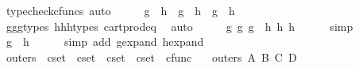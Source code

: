 \begin{isabellebody}
\ {\isacharparenleft}{\kern0pt}typecheck{\isacharunderscore}{\kern0pt}cfuncs{\isacharcomma}{\kern0pt}\ auto{\isacharparenright}{\kern0pt}\isanewline
\ \ \isamarkupfalse%
\ \isamarkupfalse%
\ {\isachardoublequoteopen}g{}\ {\isacharequal}{\kern0pt}\ h{}\ {\isasymand}\ g{}\ {\isacharequal}{\kern0pt}\ h{}\ {\isasymand}\ g{}\ {\isacharequal}{\kern0pt}\ h{}{\isachardoublequoteclose}\isanewline
\ \ \ \ \isamarkupfalse%
\ g{}{\isacharunderscore}{\kern0pt}g{}{\isacharunderscore}{\kern0pt}g{}{\isacharunderscore}{\kern0pt}types\ h{}{\isacharunderscore}{\kern0pt}h{}{\isacharunderscore}{\kern0pt}h{}{\isacharunderscore}{\kern0pt}types\ cart{\isacharunderscore}{\kern0pt}prod{\isacharunderscore}{\kern0pt}eq{}\ \isamarkupfalse%
\ auto\isanewline
\ \ \isamarkupfalse%
\ \isamarkupfalse%
\ {\isachardoublequoteopen}{\isasymlangle}g{}{\isacharcomma}{\kern0pt}\ {\isasymlangle}g{}{\isacharcomma}{\kern0pt}\ g{}{\isasymrangle}{\isasymrangle}\ {\isacharequal}{\kern0pt}\ {\isasymlangle}h{}{\isacharcomma}{\kern0pt}\ {\isasymlangle}h{}{\isacharcomma}{\kern0pt}\ h{}{\isasymrangle}{\isasymrangle}{\isachardoublequoteclose}\isanewline
\ \ \ \ \isamarkupfalse%
\ simp\isanewline
\ \ \isamarkupfalse%
\ \isamarkupfalse%
\ {\isachardoublequoteopen}g\ {\isacharequal}{\kern0pt}\ h{\isachardoublequoteclose}\isanewline
\ \ \ \ \isamarkupfalse%
\ {\isacharparenleft}{\kern0pt}simp\ add{\isacharcolon}{\kern0pt}\ g{\isacharunderscore}{\kern0pt}expand\ h{\isacharunderscore}{\kern0pt}expand{\isacharparenright}{\kern0pt}\isanewline
{}\isamarkupfalse%
%
\endisatagproof
{\isafoldproof}%
%
\isadelimproof
%
\endisadelimproof
%
\isadelimdocument
%
\endisadelimdocument
%
\isatagdocument
%
\isamarkuptrue%
%
\endisatagdocument
{\isafolddocument}%
%
\isadelimdocument
%
\endisadelimdocument
{}\isamarkupfalse%
\ outers\ {\isacharcolon}{\kern0pt}{\isacharcolon}{\kern0pt}\ {\isachardoublequoteopen}cset\ {\isasymRightarrow}\ cset\ {\isasymRightarrow}\ cset\ {\isasymRightarrow}\ cset\ {\isasymRightarrow}\ cfunc{\isachardoublequoteclose}\ \isanewline
\ \ {\isachardoublequoteopen}outers\ A\ B\ C\ D\ {\isacharequal}{\kern0pt}\ {\isasymlangle}\isanewline

\end{isabellebody}
